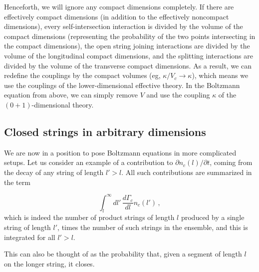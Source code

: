 \documentclass[a4paper,11pt]{article}
\begin{document}
Henceforth, we will ignore any compact dimensions completely. If there are
effectively compact dimensions (in addition to the effectively noncompact
dimensions), every self-intersection interaction is divided by the volume
of the compact dimensions (representing the probability of the two points
intersecting in the compact dimensions), the open string joining interactions
are divided by the volume of the longitudinal compact dimensions, and the
splitting interactions are divided by the volume of the transverse compact
dimensions. As a result, we can redefine the couplings by the compact volumes
(eg, $\kappa/V_c\to\kappa$), which means we use the couplings of the 
lower-dimensional effective theory. In the Boltzmann equation from 
\cite{Lowe:1994nm} above, we can simply remove $V$ and use the coupling
$\kappa$ of the $(0+1)$-dimensional theory. 


\subsection{Closed strings in arbitrary dimensions}
We are now in a position to pose Boltzmann equations in more complicated setups.
Let us consider an example of a contribution to $\partial n_c(l)/\partial t$, coming from the decay of any string of length $l'>l$.
All such contributions are summarized in the term

\begin{equation}
    \int_l^\infty{dl'\,\frac{d\Gamma_{c}}{dl}n_c(l')}\, ,
\end{equation}
which is indeed the number of product strings of length $l$ produced by a single string of length $l'$, times the number of such strings in the ensemble, and this is integrated
for all $l'>l$.

This can also be thought of as the probability that,
given a segment of length $l$ on the longer string, it closes.
\end{document}
